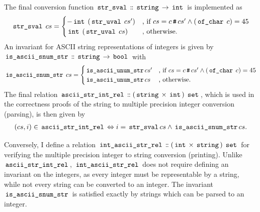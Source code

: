 The final conversion function $\,\text{\ttfamily str\_sval}\, \mathrel{\mathord{:}\mkern-1.2mu\mathord{:}} \,\text{\ttfamily string}\, \rightarrow \,\text{\ttfamily int}\,$ is implemented as
\begin{gather*}
	\,\text{\ttfamily str\_sval}\, \; cs =
	\begin{cases}
		- \,\text{\ttfamily int}\, \; (\,\text{\ttfamily str\_uval}\, \; cs') & \text{, if $cs = c \,\text{\ttfamily \#}\, cs' \land (\,\text{\ttfamily of\_char}\, \; c) = 45$} \\
		\,\text{\ttfamily int}\, \;   (\,\text{\ttfamily str\_uval}\, \; cs)  & \text{, otherwise.}
	\end{cases}
\end{gather*}
An invariant for ASCII string representations of integers is given by $\,\text{\ttfamily is\_ascii\_snum\_str}\, \mathrel{\mathord{:}\mkern-1.2mu\mathord{:}} \,\text{\ttfamily string}\, \rightarrow \,\text{\ttfamily bool}\,$ with
\begin{gather*}
	\,\text{\ttfamily is\_ascii\_snum\_str}\, \; cs =
	\begin{cases}
		\,\text{\ttfamily is\_ascii\_unum\_str}\, cs' & \text{, if $cs = c \,\text{\ttfamily \#}\, cs' \land (\,\text{\ttfamily of\_char}\, \; c) = 45$} \\
		\,\text{\ttfamily is\_ascii\_unum\_str}\, cs  & \text{, otherwise.}
	\end{cases}
\end{gather*}
The final relation $\,\text{\ttfamily ascii\_str\_int\_rel}\, \mathrel{\mathord{:}\mkern-1.2mu\mathord{:}} (\,\text{\ttfamily string}\, \times \,\text{\ttfamily int}\,) \; \,\text{\ttfamily set}\,$, which is used in the correctness proofs of the string to multiple precision integer conversion (parsing), is then given by
\begin{gather*}
	(cs,i) \in \,\text{\ttfamily ascii\_str\_int\_rel}\, \Leftrightarrow i = \,\text{\ttfamily str\_sval}\, cs \land \,\text{\ttfamily is\_ascii\_snum\_str}\, cs.
\end{gather*}

Conversely, I define a relation $\,\text{\ttfamily int\_ascii\_str\_rel}\, \mathrel{\mathord{:}\mkern-1.2mu\mathord{:}} (\,\text{\ttfamily int}\, \times \,\text{\ttfamily string}\,) \; \,\text{\ttfamily set}\,$ for verifying the multiple precision integer to string conversion (printing).
Unlike $\,\text{\ttfamily ascii\_str\_int\_rel}\,$, $\,\text{\ttfamily int\_ascii\_str\_rel}\,$ does not require defining an invariant on the integers, as every integer must be representable by a string, while not every string can be converted to an integer.
The invariant $\,\text{\ttfamily is\_ascii\_snum\_str}\,$ is satisfied exactly by strings which can be parsed to an integer.

